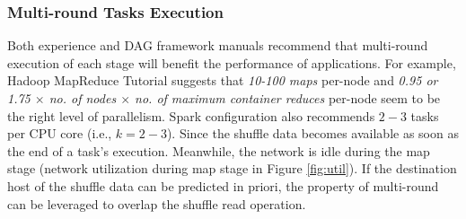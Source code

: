 \subsubsection{Multi-round Tasks Execution}\label{multi}
\ifrevision
{}
\fi
Both experience and DAG framework manuals recommend that multi-round execution of each stage will benefit the performance of applications.
For example, Hadoop MapReduce Tutorial \cite{hadooptutorial} suggests that \textit{10-100 maps} per-node and \textit{0.95 or 1.75 $\times$ no. of nodes $\times$ no. of maximum container reduces} per-node seem to be the right level of parallelism. 
Spark configuration also recommends $2-3$ tasks per CPU core \cite{sparkconf} (i.e., $k = 2-3$).
Since the shuffle data becomes available as soon as the end of a task's execution. 
Meanwhile, the network is idle during the map stage (network utilization during map stage in Figure \ref{fig:util}). 
If the destination host of the shuffle data can be predicted in priori, the property of multi-round can be leveraged to overlap the shuffle read operation.
\ifrevision
{}
\fi
{}
